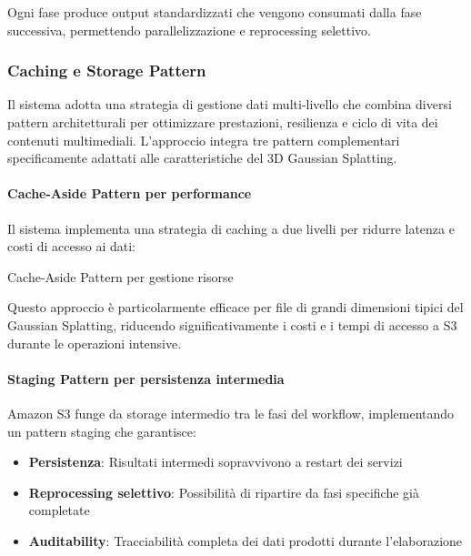 Ogni fase produce output standardizzati che vengono consumati dalla fase successiva, permettendo parallelizzazione e reprocessing selettivo.

\subsubsection{Caching e Storage Pattern}

Il sistema adotta una strategia di gestione dati multi-livello che combina diversi pattern architetturali per ottimizzare prestazioni, resilienza e ciclo di vita dei contenuti multimediali. L'approccio integra tre pattern complementari specificamente adattati alle caratteristiche del 3D Gaussian Splatting.

\paragraph{Cache-Aside Pattern per performance}
Il sistema implementa una strategia di caching a due livelli per ridurre latenza e costi di accesso ai dati:

\begin{algorithm}[h]
	\caption{Cache-Aside Pattern per gestione risorse}
	\SetAlgoLined
	
\end{algorithm}

Questo approccio è particolarmente efficace per file di grandi dimensioni tipici del Gaussian Splatting, riducendo significativamente i costi e i tempi di accesso a S3 durante le operazioni intensive.

\paragraph{Staging Pattern per persistenza intermedia}
Amazon S3 funge da storage intermedio tra le fasi del workflow, implementando un pattern staging che garantisce:

\begin{itemize}
	\item \textbf{Persistenza}: Risultati intermedi sopravvivono a restart dei servizi
	\item \textbf{Reprocessing selettivo}: Possibilità di ripartire da fasi specifiche già completate
	\item \textbf{Auditability}: Tracciabilità completa dei dati prodotti durante l'elaborazione
\end{itemize}

